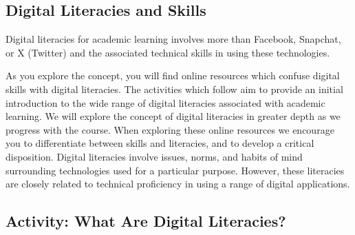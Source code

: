 \documentclass[
  letterpaper,
  DIV=11,
  numbers=noendperiod]{scrreprt}
\begin{document}
\subsection{Digital Literacies and
Skills}\label{digital-literacies-and-skills}

Digital literacies for academic learning involves more than Facebook,
Snapchat, or X (Twitter) and the associated technical skills in using
these technologies.

As you explore the concept, you will find online resources which confuse
digital skills with digital literacies. The activities which follow aim
to provide an initial introduction to the wide range of digital
literacies associated with academic learning. We will explore the
concept of digital literacies in greater depth as we progress with the
course. When exploring these online resources we encourage you to
differentiate between skills and literacies, and to develop a critical
disposition. Digital literacies involve issues, norms, and habits of
mind surrounding technologies used for a particular purpose. However,
these literacies are closely related to technical proficiency in using a
range of digital applications.

\subsection{Activity: What Are Digital
Literacies?}\label{activity-what-are-digital-literacies}
\end{document}
